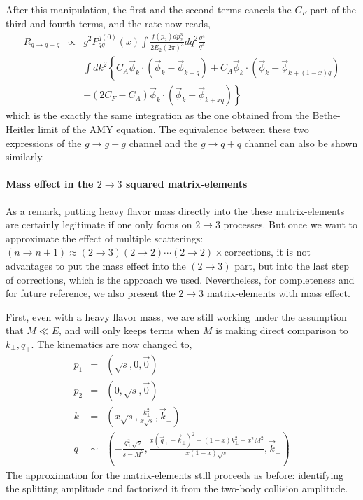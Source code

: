 After this manipulation, the first and the second terms cancels the $C_F$ part of the third and fourth terms, and the rate now reads,
\begin{eqnarray}
R_{q\rightarrow q+g} &\propto& g^2 P_{qg}^{q(0)}(x) \int  \frac{f(p_2)dp_2^3}{2E_2(2\pi)^3} d q^2 \frac{g^4}{q^4}\\\nonumber
&&  \int d k^2\left\{
C_A\vec{\phi}_{k}\cdot \left( \vec{\phi}_{k}-\vec{\phi}_{k+q} \right)
+C_A\vec{\phi}_{k} \cdot \left( \vec{\phi}_k - \vec{\phi}_{k+(1-x)q}\right) \right.\\\nonumber
&&\left.+(2C_F-C_A)\vec{\phi}_{k} \cdot \left(\vec{\phi}_k-\vec{\phi}_{k+xq} \right)
\right\}
\end{eqnarray}
which is the exactly the same integration as the one obtained from the Bethe-Heitler limit of the AMY equation.
The equivalence between these two expressions of the $g\rightarrow g+g$ channel and the $g\rightarrow q+\bar{q}$ channel can also be shown similarly.

\paragraph*{Mass effect in the $2\rightarrow 3$ squared matrix-elements}
As a remark, putting heavy flavor mass directly into the these matrix-elements are certainly legitimate if one only focus on $2\rightarrow 3$ processes.
But once we want to approximate the effect of multiple scatterings:
$(n \rightarrow n+1) \approx (2 \rightarrow 3)(2 \rightarrow 2)\cdots(2 \rightarrow 2)\times \textrm{corrections}$, it is not advantages to put the mass effect into the $(2 \rightarrow 3)$ part, but into the last step of corrections, which is the approach we used.
Nevertheless, for completeness and for future reference, we also present the $2\rightarrow 3$ matrix-elements with mass effect.

First, even with a heavy flavor mass, we are still working under the assumption that $M \ll E$, and will only keeps terms when $M$ is making direct comparison to $k_\perp, q_\perp$.
The kinematics are now changed to,
\begin{eqnarray}
p_1 &=& (\sqrt{s}, 0, \vec{0})\\
p_2 &=& (0, \sqrt{s}, \vec{0})\\
k &=& (x\sqrt{s}, \frac{k_\perp^2}{x\sqrt{s}}, \vec{k}_\perp)\\
q &\sim& (-\frac{q_\perp^2\sqrt{s}}{s-M^2}, \frac{x(\vec{q}_\perp-\vec{k}_\perp)^2 + (1-x)k_\perp^2 + x^2M^2}{x(1-x)\sqrt{s}}, \vec{k}_\perp)
\end{eqnarray}
The approximation for the matrix-elements still proceeds as before: identifying the splitting amplitude and factorized it from the two-body collision amplitude.

